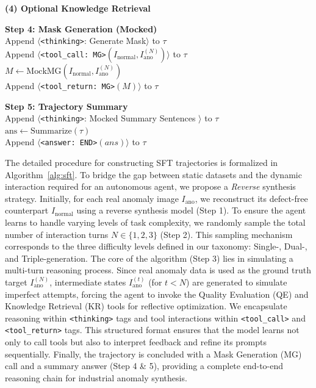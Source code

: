 \documentclass[sigconf]{acmart}
\begin{document}
\begin{algorithm}[t]
{    \textbf{(4) Optional Knowledge Retrieval} \\
}

\textbf{Step 4: Mask Generation (Mocked)} \\
Append $\langle$\texttt{<thinking>}: Generate Mask$\rangle$ to $\tau$ \\
Append $\langle$\texttt{<tool\_call: MG>}$(I_{\text{normal}}, I_{\text{ano}}^{(N)})\rangle$ to $\tau$ \\
$M \leftarrow \text{MockMG}(I_{\text{normal}}, I_{\text{ano}}^{(N)})$ \\
Append $\langle$\texttt{<tool\_return: MG>}$(M)\rangle$ to $\tau$

\textbf{Step 5: Trajectory Summary} \\

Append $\langle$\texttt{<thinking>}: Mocked Summary Sentences $\rangle$ to $\tau$ \\
$\text{ans} \leftarrow \text{Summarize}(\tau)$ \\
Append $\langle$\texttt{<answer: END>}$(ans)\rangle$ to $\tau$ \\
\Return{$(\tau)$}
\end{algorithm}
 
The detailed procedure for constructing SFT trajectories is formalized in Algorithm~\ref{alg:sft}. To bridge the gap between static datasets and the dynamic interaction required for an autonomous agent, we propose a \textit{Reverse} synthesis strategy. Initially, for each real anomaly image $I_{\text{ano}}$, we reconstruct its defect-free counterpart $I_{\text{normal}}$ using a reverse synthesis model (Step 1). To ensure the agent learns to handle varying levels of task complexity, we randomly sample the total number of interaction turns $N \in \{1, 2, 3\}$ (Step 2). This sampling mechanism corresponds to the three difficulty levels defined in our taxonomy: Single-, Dual-, and Triple-generation. The core of the algorithm (Step 3) lies in simulating a multi-turn reasoning process. Since real anomaly data is used as the ground truth target $I_{\text{ano}}^{(N)}$, intermediate states $I_{\text{ano}}^{(t)}$ (for $t < N$) are generated to simulate imperfect attempts, forcing the agent to invoke the Quality Evaluation (QE) and Knowledge Retrieval (KR) tools for reflective optimization. We encapsulate reasoning within \texttt{<thinking>} tags and tool interactions within \texttt{<tool\_call>} and \texttt{<tool\_return>} tags. This structured format ensures that the model learns not only to call tools but also to interpret feedback and refine its prompts sequentially. Finally, the trajectory is concluded with a Mask Generation (MG) call and a summary answer (Step 4 \& 5), providing a complete end-to-end reasoning chain for industrial anomaly synthesis.
\end{document}
